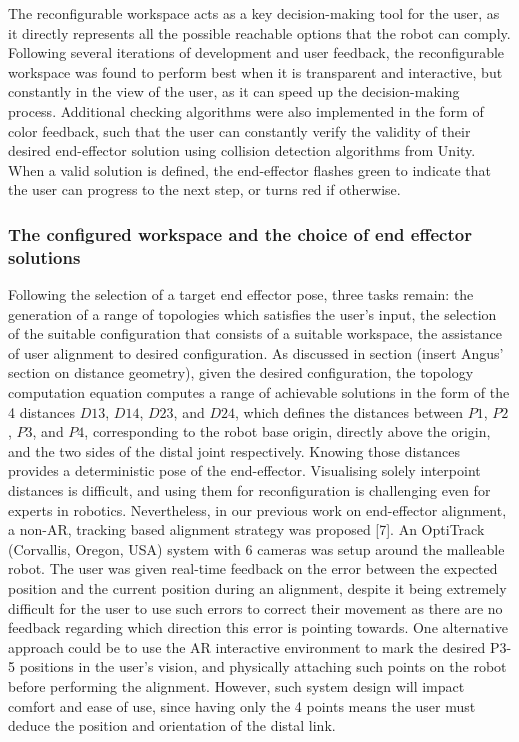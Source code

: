 The reconfigurable workspace acts as a key decision-making tool for the user, as it directly represents all the possible reachable options that the robot can comply. Following several iterations of development and user feedback, the reconfigurable workspace was found to perform best when it is transparent and interactive, but constantly in the view of the user, as it can speed up the decision-making process. Additional checking algorithms were also implemented in the form of color feedback, such that the user can constantly verify the validity of their desired end-effector solution using collision detection algorithms from Unity.  When a valid solution is defined, the end-effector flashes green to indicate that the user can progress to the next step, or turns red if otherwise.

\subsubsection{The configured workspace and the choice of end effector solutions}
Following the selection of a target end effector pose, three tasks remain: the generation of a range of topologies which satisfies the user’s input, the selection of the suitable configuration that consists of a suitable workspace, the assistance of user alignment to desired configuration.
As discussed in section (insert Angus’ section on distance geometry), given the desired configuration, the topology computation equation computes a range of achievable solutions in the form of the 4 distances $D13$, $D14$, $D23$, and $D24$, which defines the distances between $P1$, $P2$, $P3$, and $P4$, corresponding to the robot base origin, directly above the origin, and the two sides of the distal joint respectively. Knowing those distances provides a deterministic pose of the end-effector. 
Visualising solely interpoint distances is difficult, and using them for reconfiguration is challenging even for experts in robotics. Nevertheless, in our previous work on end-effector alignment, a non-AR, tracking based alignment strategy was proposed [7]. An OptiTrack (Corvallis, Oregon, USA) system with 6 cameras was setup around the malleable robot. The user was given real-time feedback on the error between the expected position and the current position during an alignment, despite it being extremely difficult for the user to use such errors to correct their movement as there are no feedback regarding which direction this error is pointing towards. One alternative approach could be to use the AR interactive environment to mark the desired P3-5 positions in the user's vision, and physically attaching such points on the robot before performing the alignment. However, such system design will impact comfort and ease of use, since having only the 4 points means the user must deduce the position and orientation of the distal link.
